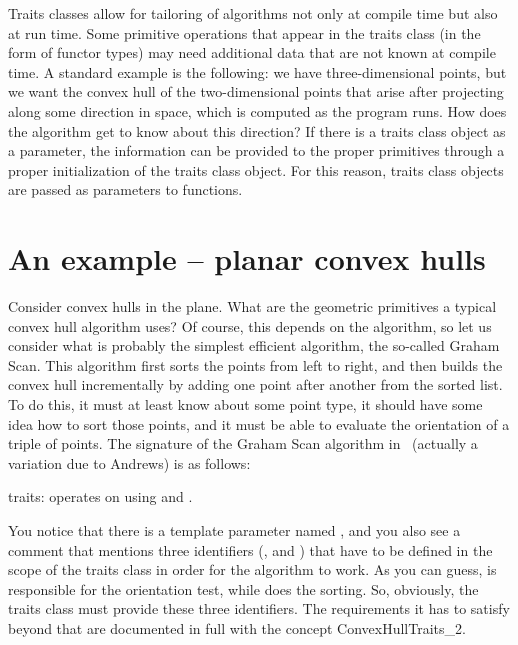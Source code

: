 Traits classes allow for tailoring of algorithms not only at compile
time but also at run time.  Some primitive operations that appear in
the traits class (in the form of functor types) may need additional
data that are not known at compile time.  A standard example is the
following: we have three-dimensional points, but we want the convex
hull of the two-dimensional points that arise after projecting along
some direction in space, which is computed as the program runs. How
does the algorithm get to know about this direction? If there is a
traits class object as a parameter, the information can be provided to
the proper primitives through a proper initialization of the traits
class object.  For this reason, traits class objects are passed as
parameters to functions.

\section{An example -- planar convex hulls\label{sec:traits_class_example}}

Consider convex hulls in the plane. What are the geometric primitives a 
typical 
convex hull algorithm uses? Of course, this depends on the algorithm, so
let us consider what is probably the simplest efficient algorithm, the 
so-called Graham Scan. This algorithm first sorts the points from left to right,
and then builds the convex hull incrementally by adding one point after
another from the sorted list. To do this, it must at least know about 
some point type, it should have some idea how to sort those points, and
it must be able to evaluate the orientation of a triple of points. The
signature of the Graham Scan algorithm in \cgal\ (actually a variation 
due to Andrews) is as follows:

\ccAutoIndexingOff
{}
           {{\sc traits}: operates on  using
             and 
            .
           }
\ccAutoIndexingOn

You notice that there is a template parameter named , 
and you also see a comment that mentions three identifiers (, 
 and ) that have to be defined in the
scope of the traits class in order for the algorithm to work.
As you can guess,  is responsible for the orientation 
test, while  does the sorting. So, obviously, the traits class
must provide these three identifiers. The requirements it has to satisfy
beyond that are documented in full with the concept ConvexHullTraits\_2.

